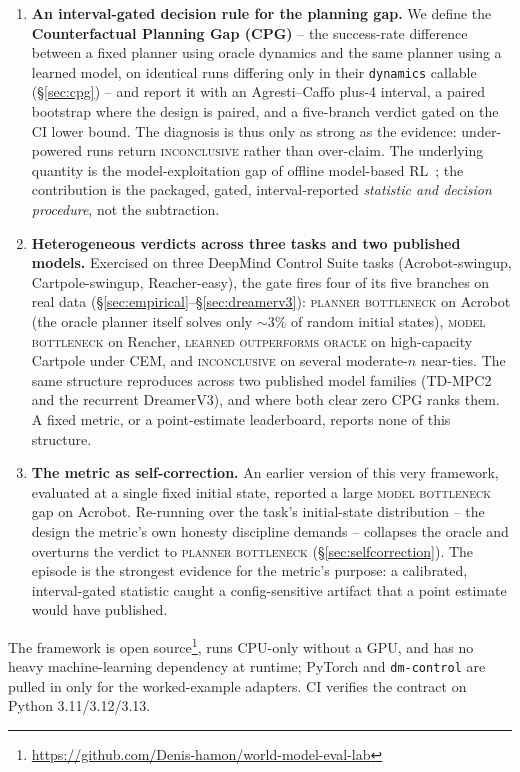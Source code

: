 \documentclass[10pt,letterpaper]{article}
\begin{document}
\begin{enumerate}
  \item \textbf{An interval-gated decision rule for the planning gap.} We define the \textbf{Counterfactual Planning Gap (CPG)} -- the success-rate difference between a fixed planner using oracle dynamics and the same planner using a learned model, on identical runs differing only in their \texttt{dynamics} callable (\S\ref{sec:cpg}) -- and report it with an Agresti--Caffo plus-4 interval, a paired bootstrap where the design is paired, and a five-branch verdict gated on the CI lower bound. The diagnosis is thus only as strong as the evidence: under-powered runs return \textsc{inconclusive} rather than over-claim. The underlying quantity is the model-exploitation gap of offline model-based RL~\citep{yu2020mopo,kidambi2020morel}; the contribution is the packaged, gated, interval-reported \emph{statistic and decision procedure}, not the subtraction.
  \item \textbf{Heterogeneous verdicts across three tasks and two published models.} Exercised on three DeepMind Control Suite tasks (Acrobot-swingup, Cartpole-swingup, Reacher-easy), the gate fires four of its five branches on real data (\S\ref{sec:empirical}--\S\ref{sec:dreamerv3}): \textsc{planner bottleneck} on Acrobot (the oracle planner itself solves only $\sim\!3\%$ of random initial states), \textsc{model bottleneck} on Reacher, \textsc{learned outperforms oracle} on high-capacity Cartpole under CEM, and \textsc{inconclusive} on several moderate-$n$ near-ties. The same structure reproduces across two published model families (TD-MPC2 and the recurrent DreamerV3), and where both clear zero CPG ranks them. A fixed metric, or a point-estimate leaderboard, reports none of this structure.
  \item \textbf{The metric as self-correction.} An earlier version of this very framework, evaluated at a single fixed initial state, reported a large \textsc{model bottleneck} gap on Acrobot. Re-running over the task's initial-state distribution -- the design the metric's own honesty discipline demands -- collapses the oracle and overturns the verdict to \textsc{planner bottleneck} (\S\ref{sec:selfcorrection}). The episode is the strongest evidence for the metric's purpose: a calibrated, interval-gated statistic caught a config-sensitive artifact that a point estimate would have published.
\end{enumerate}

The framework is open source\footnote{\url{https://github.com/Denis-hamon/world-model-eval-lab}}, runs CPU-only without a GPU, and has no heavy machine-learning dependency at runtime; PyTorch and \texttt{dm-control} are pulled in only for the worked-example adapters. CI verifies the contract on Python 3.11/3.12/3.13.
\end{document}
